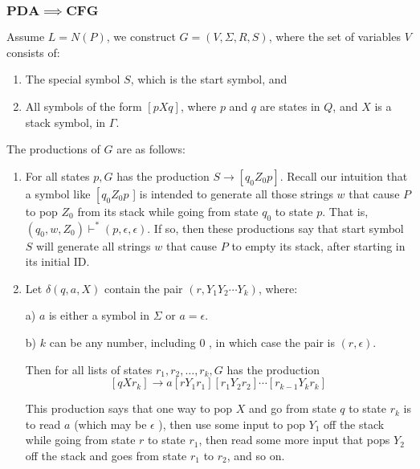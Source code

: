 \subsubsection{$\mathbf{PDA \implies CFG}$}
Assume $L = N(P)$, we construct $G=(V, \Sigma, R, S)$, where the set of variables $V$ consists of:
    \begin{enumerate}
        \item The special symbol $S$, which is the start symbol, and
        \item All symbols of the form $[p X q]$, where $p$ and $q$ are states in $Q$, and $X$ is a stack symbol, in $\Gamma$.
    \end{enumerate}
The productions of $G$ are as follows:
\begin{enumerate}
    \item For all states $p, G$ has the production $S \rightarrow\left[q_0 Z_0 p\right]$. Recall our intuition that a symbol like $\left[q_0 Z_0 p\right.$ ] is intended to generate all those strings $w$ that cause $P$ to pop $Z_0$ from its stack while going from state $q_0$ to state $p$. That is, $\left(q_0, w, Z_0\right) \vdash^*(p, \epsilon, \epsilon)$. If so, then these productions say that start symbol $S$ will generate all strings $w$ that cause $P$ to empty its stack, after starting in its initial ID.
    \item Let $\delta(q, a, X)$ contain the pair $\left(r, Y_1 Y_2 \cdots Y_k\right)$, where:
    
a) $a$ is either a symbol in $\Sigma$ or $a=\epsilon$.

b) $k$ can be any number, including 0 , in which case the pair is $(r, \epsilon)$.

Then for all lists of states $r_1, r_2, \ldots, r_k, G$ has the production
$$
\left[q X r_k\right] \rightarrow a\left[r Y_1 r_1\right]\left[r_1 Y_2 r_2\right] \cdots\left[r_{k-1} Y_k r_k\right]
$$

This production says that one way to pop $X$ and go from state $q$ to state $r_k$ is to read $a$ (which may be $\epsilon$ ), then use some input to pop $Y_1$ off the stack while going from state $r$ to state $r_1$, then read some more input that pops $Y_2$ off the stack and goes from state $r_1$ to $r_2$, and so on.

\end{enumerate}
